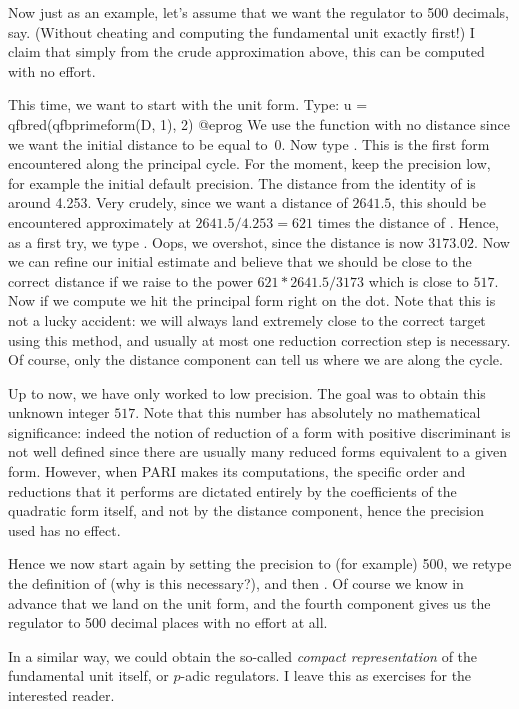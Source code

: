 Now just as an example, let's assume that we want the regulator to 500
decimals, say. (Without cheating and computing the fundamental unit exactly
first!) I claim that simply from the crude approximation above, this can be
computed with no effort.

This time, we want to start with the unit form. Type:
\bprog
  u = qfbred(qfbprimeform(D, 1), 2)
@eprog\noindent
We use the function  with no distance since we want the initial
distance to be equal to~0. Now type  . This is the
first form encountered along the principal cycle. For the moment, keep the
precision low, for example the initial default precision. The distance from
the identity of  is around 4.253. Very crudely, since we want a
distance of $2641.5$, this should be encountered approximately at
$2641.5/4.253=621$ times the distance of . Hence, as a first try, we
type . Oops, we overshot, since the distance is now $3173.02$.
Now we can refine our initial estimate and believe that we should be close to
the correct distance if we raise  to the power $621*2641.5/3173$ which
is close to $517$. Now if we compute  we hit the principal
form right on the dot. Note that this is not a lucky accident: we will always
land extremely close to the correct target using this method, and usually at
most one reduction correction step is necessary. Of course, only the distance
component can tell us where we are along the cycle.

Up to now, we have only worked to low precision. The goal was to obtain this
unknown integer $517$. Note that this number has absolutely no mathematical
significance: indeed the notion of reduction of a form with positive
discriminant is not well defined since there are usually many reduced forms
equivalent to a given form. However, when PARI makes its computations, the
specific order and reductions that it performs are dictated entirely by the
coefficients of the quadratic form itself, and not by the distance component,
hence the precision used has no effect.

Hence we now start again by setting the precision to (for example) 500,
we retype the definition of  (why is this necessary?), and then
. Of course we know in advance that we land on the
unit form, and the fourth component gives us the regulator to 500 decimal
places with no effort at all.

In a similar way, we could obtain the so-called \emph{compact representation}
of the fundamental unit itself, or $p$-adic regulators. I leave this as
exercises for the interested reader.

